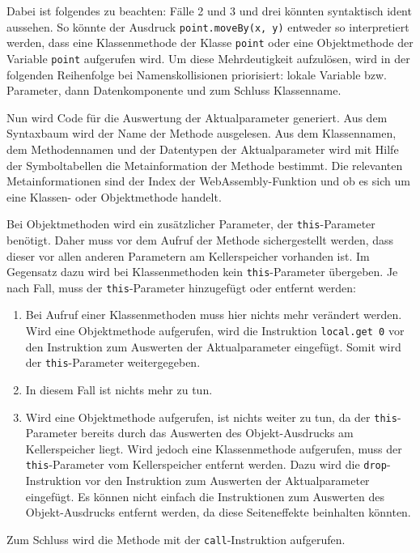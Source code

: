 Dabei ist folgendes zu beachten: Fälle 2 und 3 und drei könnten syntaktisch ident aussehen. So könnte der Ausdruck \lstinline{point.moveBy(x, y)} entweder so interpretiert werden, dass eine Klassenmethode der Klasse \lstinline{point} oder eine Objektmethode der Variable \lstinline{point} aufgerufen wird. Um diese Mehrdeutigkeit aufzulösen, wird in der folgenden Reihenfolge bei Namenskollisionen priorisiert: lokale Variable bzw. Parameter, dann Datenkomponente und zum Schluss Klassenname.

Nun wird Code für die Auswertung der Aktualparameter generiert. Aus dem Syntaxbaum wird der Name der Methode ausgelesen. Aus dem Klassennamen, dem Methodennamen und der Datentypen der Aktualparameter wird mit Hilfe der Symboltabellen die Metainformation der Methode bestimmt. Die relevanten Metainformationen sind der Index der WebAssembly-Funktion und ob es sich um eine Klassen- oder Objektmethode handelt.

Bei Objektmethoden wird ein zusätzlicher Parameter, der \lstinline{this}-Parameter benötigt. Daher muss vor dem Aufruf der Methode sichergestellt werden, dass dieser vor allen anderen Parametern am Kellerspeicher vorhanden ist. Im Gegensatz dazu wird bei Klassenmethoden kein \lstinline{this}-Parameter übergeben. Je nach Fall, muss der \lstinline{this}-Parameter hinzugefügt oder entfernt werden:

\begin{enumerate}
    \item Bei Aufruf einer Klassenmethoden muss hier nichts mehr verändert werden. Wird eine Objektmethode aufgerufen, wird die Instruktion \lstinline{local.get 0} vor den Instruktion zum Auswerten der Aktualparameter eingefügt. Somit wird der \lstinline{this}-Parameter weitergegeben.
    \item In diesem Fall ist nichts mehr zu tun.
    \item Wird eine Objektmethode aufgerufen, ist nichts weiter zu tun, da der \lstinline{this}-Parameter bereits durch das Auswerten des Objekt-Ausdrucks am Kellerspeicher liegt. Wird jedoch eine Klassenmethode aufgerufen, muss der \lstinline{this}-Parameter vom Kellerspeicher entfernt werden. Dazu wird die \lstinline{drop}-Instruktion vor den Instruktion zum Auswerten der Aktualparameter eingefügt. Es können nicht einfach die Instruktionen zum Auswerten des Objekt-Ausdrucks entfernt werden, da diese Seiteneffekte beinhalten könnten.
\end{enumerate}

Zum Schluss wird die Methode mit der \lstinline{call}-Instruktion aufgerufen.

